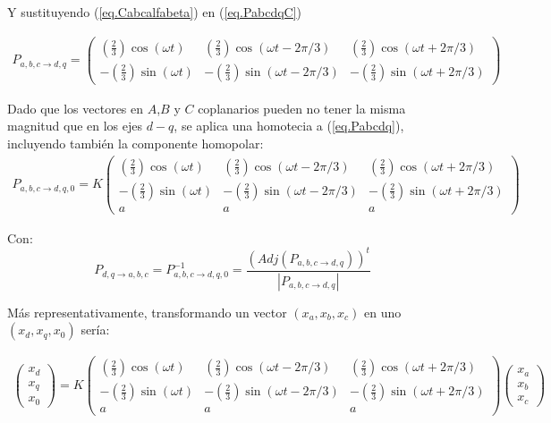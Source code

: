 \documentclass{report}
\begin{document}
Y sustituyendo  (\ref{eq.Cabcalfabeta}) en (\ref{eq.PabcdqC})

\begin{eqnarray}
 P_{a,b,c\to d,q}=
\left( \begin{array}{cccc}
(\frac{2}{3})\cos(\omega t) & (\frac{2}{3})\cos(\omega t - 2\pi/3) & (\frac{2}{3})\cos(\omega t + 2\pi/3)\\
-(\frac{2}{3})\sin(\omega t) & -(\frac{2}{3})\sin(\omega t - 2\pi/3) & -(\frac{2}{3})\sin(\omega t + 2\pi/3)\end{array} \right)\label{eq.Pabcdq}
\end{eqnarray}  

Dado que los vectores en $A$,$B$ y $C$ coplanarios pueden no tener la misma magnitud que en los ejes $d-q$, se aplica una homotecia a (\ref{eq.Pabcdq}), incluyendo también la componente homopolar:
\begin{eqnarray}
    P_{a,b,c\to d,q,0}= K
   \left( \begin{array}{cccc}
   (\frac{2}{3})\cos(\omega t) & (\frac{2}{3})\cos(\omega t - 2\pi/3) & (\frac{2}{3})\cos(\omega t + 2\pi/3)\\
   -(\frac{2}{3})\sin(\omega t) & -(\frac{2}{3})\sin(\omega t - 2\pi/3) & -(\frac{2}{3})\sin(\omega t + 2\pi/3)\\
    a & a & a \end{array} \right)
   \label{eq.KPabcdq}
   \end{eqnarray}  

Con:
   \begin{equation}
    P_{d,q \to a,b,c}  = P_{a,b,c\to d,q,0}^{-1} = \frac{(Adj(P_{a,b,c\to d,q}))^{t}}{ \left\lvert P_{a,b,c\to d,q }\right\rvert } \label{eq.Pdq0abc}
\end{equation}

Más representativamente, transformando un vector $(x_a, x_b, x_c)$ en uno $(x_d,x_q,x_0)$ sería:

\begin{eqnarray}
    \left(\begin{array}{cc}
    x_{d}\\
    x_{q}\\
    x_{0}
    \end{array}\right) = K
    \left( \begin{array}{cccc}
    (\frac{2}{3})\cos(\omega t) & (\frac{2}{3})\cos(\omega t - 2\pi/3) & (\frac{2}{3})\cos(\omega t + 2\pi/3)\\
    -(\frac{2}{3})\sin(\omega t) & -(\frac{2}{3})\sin(\omega t - 2\pi/3) & -(\frac{2}{3})\sin(\omega t + 2\pi/3)\\
     a & a & a \end{array} \right)
       \left(\begin{array}{cc}
        x_{a}\\
        x_{b}\\
        x_{c}
        \end{array}\right)\label{eq.KPabcdq2}
    \end{eqnarray}
    
\end{document}
